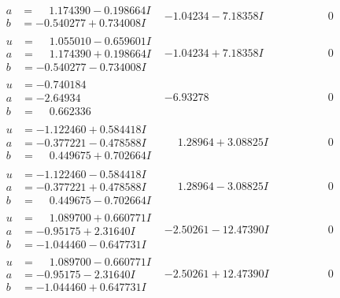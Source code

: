 \documentclass[1p]{elsarticle_modified}
\theoremstyle{definition}
\begin{document}
$$\begin{array}{c|c|c}
\begin{aligned}
a &= \phantom{-}1.174390 - 0.198664 I \\
b &= -0.540277 + 0.734008 I\end{aligned}
 & -1.04234 - 7.18358 I & \phantom{-0.000000 } 0 \\ \hline\begin{aligned}
u &= \phantom{-}1.055010 - 0.659601 I \\
a &= \phantom{-}1.174390 + 0.198664 I \\
b &= -0.540277 - 0.734008 I\end{aligned}
 & -1.04234 + 7.18358 I & \phantom{-0.000000 } 0 \\ \hline\begin{aligned}
u &= -0.740184\phantom{ +0.000000I} \\
a &= -2.64934\phantom{ +0.000000I} \\
b &= \phantom{-}0.662336\phantom{ +0.000000I}\end{aligned}
 & -6.93278\phantom{ +0.000000I} & \phantom{-0.000000 } 0 \\ \hline\begin{aligned}
u &= -1.122460 + 0.584418 I \\
a &= -0.377221 - 0.478588 I \\
b &= \phantom{-}0.449675 + 0.702664 I\end{aligned}
 & \phantom{-}1.28964 + 3.08825 I & \phantom{-0.000000 } 0 \\ \hline\begin{aligned}
u &= -1.122460 - 0.584418 I \\
a &= -0.377221 + 0.478588 I \\
b &= \phantom{-}0.449675 - 0.702664 I\end{aligned}
 & \phantom{-}1.28964 - 3.08825 I & \phantom{-0.000000 } 0 \\ \hline\begin{aligned}
u &= \phantom{-}1.089700 + 0.660771 I \\
a &= -0.95175 + 2.31640 I \\
b &= -1.044460 - 0.647731 I\end{aligned}
 & -2.50261 - 12.47390 I & \phantom{-0.000000 } 0 \\ \hline\begin{aligned}
u &= \phantom{-}1.089700 - 0.660771 I \\
a &= -0.95175 - 2.31640 I \\
b &= -1.044460 + 0.647731 I\end{aligned}
 & -2.50261 + 12.47390 I & \phantom{-0.000000 } 0 \\ \hline\begin{aligned}

\end{aligned}
\end{array}$$
\end{document}
